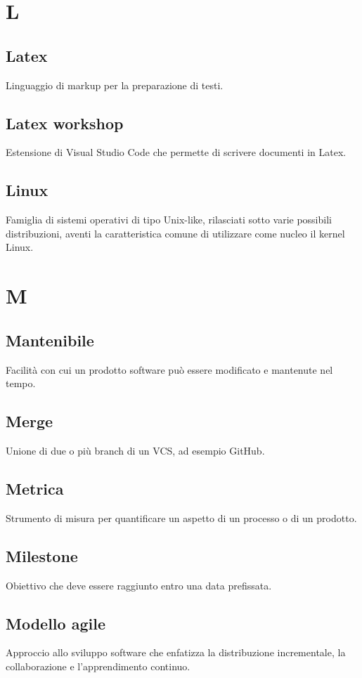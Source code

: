 \documentclass[12pt]{article}
\begin{document}
	\section{L}
		\subsection{Latex}
		Linguaggio di markup per la preparazione di testi.
		\subsection{Latex workshop}
		Estensione di Visual Studio Code che permette di scrivere documenti in Latex.
		\subsection{Linux}
		Famiglia di sistemi operativi di tipo Unix-like, rilasciati sotto varie possibili distribuzioni, aventi la caratteristica comune di utilizzare come nucleo il kernel Linux.

	\clearpage
	\section{M}
		\subsection{Mantenibile}
		Facilità con cui un prodotto software può essere modificato e mantenute nel tempo.
		\subsection{Merge}
		Unione di due o più branch di un VCS, ad esempio GitHub.
		\subsection{Metrica}
		Strumento di misura per quantificare un aspetto di un processo o di un prodotto.
		\subsection{Milestone}
		Obiettivo che deve essere raggiunto entro una data prefissata.
		\subsection{Modello agile}
		Approccio allo sviluppo software che enfatizza la distribuzione incrementale, la collaborazione e l'apprendimento continuo.
\end{document}
